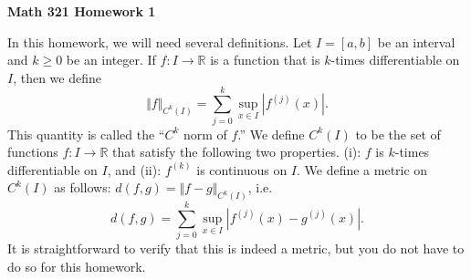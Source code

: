 \documentclass{article}
\newcommand{\R}{{\mathbb R}}
\begin{document}
\begin{center}
	{\bf Math 321 Homework 1}
\end{center}

In this homework, we will need several definitions. Let $I=[a,b]$ be an interval and $k\geq 0$ be an integer. If $f\colon I\to\R$ is a function that is $k$-times differentiable on $I$, then we define
\[
\Vert f \Vert_{C^k(I)}=\sum_{j=0}^k \sup_{x\in I} |f^{(j)}(x)|.
\]
This quantity is called the ``$C^k$ norm of $f$.''
We define $C^k(I)$ to be the set of functions $f\colon I\to\R$ that satisfy the following two properties.
(i): $f$ is $k$-times differentiable on $I$, and
(ii): $f^{(k)}$ is continuous on $I$.
We define a metric on $C^k(I)$ as follows: $d(f,g)=\Vert f-g \Vert_{C^k(I)}$, i.e.
\begin{equation}\label{CkNorm}
	d(f,g) = \sum_{j=0}^k \sup_{x\in I} |f^{(j)}(x)-g^{(j)}(x)|.
\end{equation}
It is straightforward to verify that this is indeed a metric, but you do not have to do so for this homework.
\end{document}
